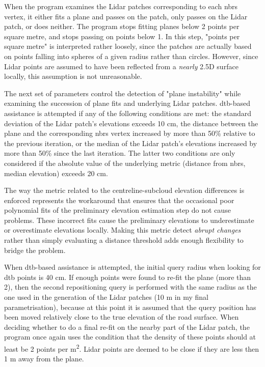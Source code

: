 When the program examines the Lidar patches corresponding to each \ac{nbrs} vertex, it either fits a plane and passes on the patch, only passes on the Lidar patch, or does neither. The program stops fitting planes below 2 points per square metre, and stops passing on points below 1. In this step, "points per square metre" is interpreted rather loosely, since the patches are actually based on points falling into spheres of a given radius rather than circles. However, since Lidar points are assumed to have been reflected from a \textit{nearly} 2.5D surface locally, this assumption is not unreasonable.

The next set of parameters control the detection of "plane instability" while examining the succession of plane fits and underlying Lidar patches. \ac{dtb}-based assistance is attempted if any of the following conditions are met: the standard deviation of the Lidar patch's elevations exceeds 10 cm, the distance between the plane and the corresponding \ac{nbrs} vertex increased by more than 50\% relative to the previous iteration, or the median of the Lidar patch's elevations increased by more than 50\% since the last iteration. The latter two conditions are only considered if the absolute value of the underlying metric (distance from \ac{nbrs}, median elevation) exceeds 20 cm.

The way the metric related to the centreline-subcloud elevation differences is enforced represents the workaround that ensures that the occasional poor polynomial fits of the preliminary elevation estimation step do not cause problems. These incorrect fits cause the preliminary elevations to underestimate or overestimate elevations locally. Making this metric detect \textit{abrupt changes} rather than simply evaluating a distance threshold adds enough flexibility to bridge the problem.

When \ac{dtb}-based assistance is attempted, the initial query radius when looking for \ac{dtb} points is 40 cm. If enough points were found to re-fit the plane (more than 2), then the second repositioning query is performed with the same radius as the one used in the generation of the Lidar patches (10 m in my final parametrisation), because at this point it is assumed that the query position has been moved relatively close to the true elevation of the road surface. When deciding whether to do a final re-fit on the nearby part of the Lidar patch, the program once again uses the condition that the density of these points should at least be 2 points per m\textsuperscript{2}. Lidar points are deemed to be close if they are less then 1 m away from the plane.


